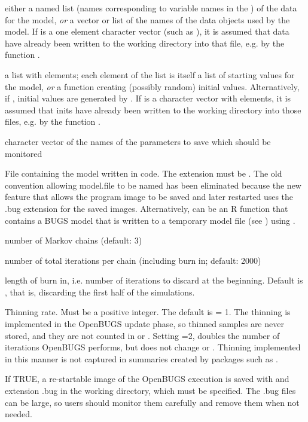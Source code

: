 \begin{Arguments}
\begin{ldescription}
\item[\code{data}] either a named list (names corresponding to variable names
in the ) of the data for the  model,
\emph{or} a vector or list of the names of the data objects used by
the model. If  is a one element character vector (such as ),
it is assumed that data have already been written to the working directory into that file,
e.g. by the function .
\item[\code{inits}] a list with  elements; each element of the
list is itself a list of starting values for the  model,
\emph{or} a function creating (possibly random) initial values.
Alternatively, if , initial values are generated
by . If  is a character vector with  elements,
it is assumed that inits have already been written to the working directory into those files,
e.g. by the function .
\item[\code{parameters.to.save}] character vector of the names of the
parameters to save which should be monitored
\item[\code{model.file}] File containing the model written in  code.
The extension must be .
The old convention allowing model.file to be named  has been eliminated
because the new  feature that allows the program image
to be saved and later restarted uses the .bug extension for the saved
images.
Alternatively,  can be an R function that contains a BUGS model that is written to a
temporary model file (see ) using .
\item[\code{n.chains}] number of Markov chains (default: 3)
\item[\code{n.iter}] number of total iterations per chain (including burn in;
default: 2000)
\item[\code{n.burnin}] length of burn in, i.e. number of iterations to
discard at the beginning. Default is , that is,
discarding the first half of the simulations.
\item[\code{n.thin}] Thinning rate. Must be a positive integer. The default is
 = 1. The thinning is implemented in the OpenBUGS update phase, so
thinned samples are never stored, and they are not counted in  or
.  Setting =2, doubles the number of iterations OpenBUGS
performs, but does not change  or .  Thinning implemented
in this manner is not captured in summaries created by packages such as .
\item[\code{saveExec}] If TRUE, a re-startable image of the OpenBUGS execution is
saved with  and extension .bug in the working
directory, which must be specified.  The .bug files can be large, so
users should monitor them carefully and remove them when not needed.


\end{ldescription}
\end{Arguments}
